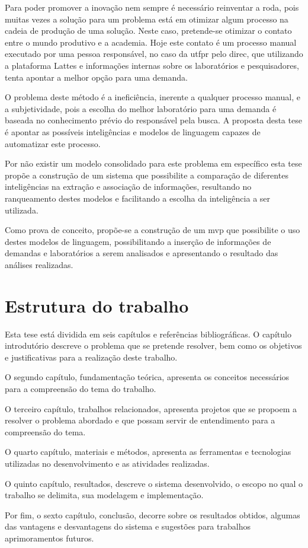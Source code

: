 Para poder promover a inovação nem sempre é necessário reinventar a roda, pois muitas vezes a solução para um problema está em otimizar algum processo na cadeia de produção de uma solução. Neste caso, pretende-se otimizar o contato entre o mundo produtivo e a academia. Hoje este contato é um processo manual executado por uma pessoa responsável, no caso da \gls{utfpr} pelo \gls{direc}, que utilizando a plataforma Lattes e informações internas sobre os laboratórios e pesquisadores, tenta apontar a melhor opção para uma demanda.

O problema deste método é a ineficiência, inerente a qualquer processo manual, e a subjetividade, pois a escolha do melhor laboratório para uma demanda é baseada no conhecimento prévio do responsável pela busca. A proposta desta tese é apontar as possíveis inteligências e modelos de linguagem capazes de automatizar este processo.

Por não existir um modelo consolidado para este problema em específico esta tese propõe a construção de um sistema que possibilite a comparação de diferentes inteligências na extração e associação de informações, resultando no ranqueamento destes modelos e facilitando a escolha da inteligência a ser utilizada.

Como prova de conceito, propõe-se a construção de um \gls{mvp} que possibilite o uso destes modelos de linguagem, possibilitando a inserção de informações de demandas e laboratórios a serem analisados e apresentando o resultado das análises realizadas.

\section{Estrutura do trabalho}\label{sec:estruturaTrabalho}

Esta tese está dividida em seis capítulos e referências bibliográficas. O capítulo introdutório descreve o problema que se pretende resolver, bem como os objetivos e justificativas para a realização deste trabalho. 

O segundo capítulo, fundamentação teórica, apresenta os conceitos necessários para a compreensão do tema do trabalho.

O terceiro capítulo, trabalhos relacionados, apresenta projetos que se propoem a resolver o problema abordado e que possam servir de entendimento para a compreensão do tema.

O quarto capítulo, materiais e métodos, apresenta as ferramentas e tecnologias utilizadas no desenvolvimento e as atividades realizadas.

O quinto capítulo, resultados, descreve o sistema desenvolvido, o escopo no qual o trabalho se delimita, sua modelagem e implementação.

Por fim, o sexto capítulo, conclusão, decorre sobre os resultados obtidos, algumas das vantagens e desvantagens do sistema e sugestões para trabalhos aprimoramentos futuros.